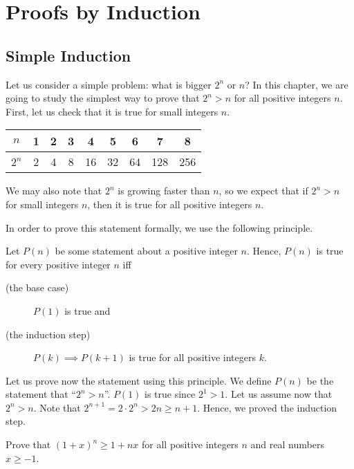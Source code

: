 \chapter{Proofs by Induction}
\section{Simple Induction}

Let us consider a simple problem: what is bigger $2^n$ or $n$? In this chapter,
we are going to study the simplest way to prove that $2^n > n$ for all positive
integers $n$. First, let us check that it is true for small integers $n$.
\begin{center}
  \begin{tabular}{c | c | c | c | c | c | c | c | c}
    $n$   & 1 & 2 & 3 & 4  & 5  & 6  & 7   & 8   \\
    \hline
    $2^n$ & 2 & 4 & 8 & 16 & 32 & 64 & 128 & 256
  \end{tabular}
\end{center}
We may also note that $2^n$ is growing faster than $n$, so we expect that if
$2^n > n$ for small integers $n$, then it is true for all positive integers $n$.

In order to prove this statement formally, we use the following principle.
\begin{principle}
  Let $P(n)$ be some statement about a positive integer $n$.
  Hence, $P(n)$ is true for every positive integer $n$ iff
  \begin{description}
    \item [(the base case)] $P(1)$ is true and
    \item [(the induction step)] $P(k) \implies P(k + 1)$ is true
      for all positive integers $k$.
  \end{description}
\end{principle}

Let us prove now the statement using this principle.
We define $P(n)$ be the statement that ``$2^n > n$''.
$P(1)$ is true since $2^1 > 1$. Let us assume now that $2^n > n$. Note that
$2^{n + 1} = 2 \cdot 2^n > 2n \ge n + 1$. Hence, we proved the induction step.

\begin{exercise}
  Prove that $(1 + x)^n \ge 1 + nx$ for all positive integers $n$ and real
  numbers $x \ge -1$.
\end{exercise}

